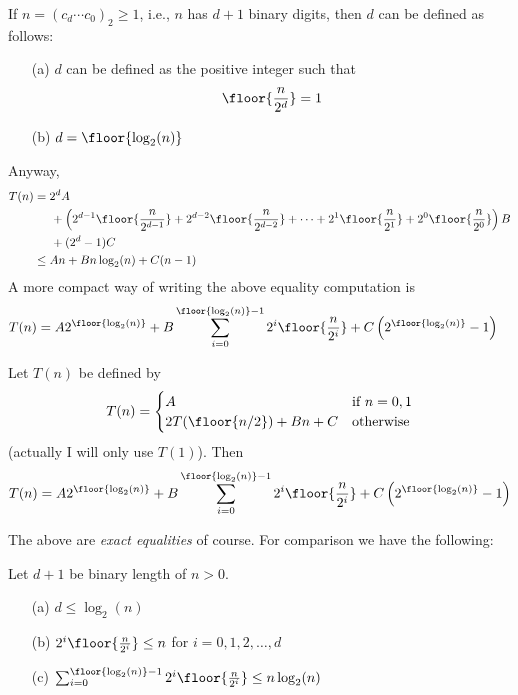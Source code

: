 \begin{thm}
If $n = (c_d \cdots c_0)_2 \geq 1$, i.e., $n$ has $d + 1$ binary digits,
then $d$ can be defined as follows:
\begin{itemize} 
\item[(a)] $d$ can be defined as the positive integer such that
\[
\floor{\frac{n}{2^d}} = 1
\]
\item[(b)] $d = \floor{\log_2(n)}$
\end{itemize}
\end{thm}

Anyway,
\begin{align*}
T(n) 
&= 2^dA \\
&\hspace{0.5cm}
+ \left(
2^{d-1}\floor{ \frac{n}{2^{d-1}} } 
+ 2^{d-2}\floor{ \frac{n}{2^{d-2}} } 
+ \cdots
+ 2^1\floor{ \frac{n}{2^1} } 
+ 2^0\floor{ \frac{n}{2^0} } 
\right)B \\ 
&\hspace{0.5cm}+ (2^d - 1)C  
\\
&\leq An + Bn \log_2(n) + C(n - 1) 
\end{align*}
A more compact way of writing the above equality computation is
\begin{align*}
T(n) 
&= A 2^{\floor{\log_2(n)}}
 + B \sum_{i=0}^{\floor{\log_2(n)} - 1} 2^i\floor{ \frac{n}{2^i} } 
 + C \left(2^{\floor{\log_2(n)}} - 1\right)
\end{align*}

\begin{thm}
Let $T(n)$ be defined by
\[
T(n) =
\begin{cases}
A                        &\text{if $n = 0, 1$} \\
2T(\floor{n/2}) + Bn + C &\text{otherwise}
\end{cases}
\]
(actually I will only use $T(1)$).
Then
\[
T(n) 
= A 2^{\floor{\log_2(n)}}
 + B \sum_{i=0}^{\floor{\log_2(n)} - 1} 2^i\floor{ \frac{n}{2^i} } 
 + C \left(2^{\floor{\log_2(n)}} - 1\right)
\]
\end{thm}

The above are \textit{exact equalities} of course.
For comparison we have the following:

\begin{thm} Let $d + 1$ be binary length of $n > 0$.
\begin{itemize}
\item[(a)] $d \leq \log_2(n)$
\item[(b)] $2^i\floor{ \frac{n}{2^i} } \leq n$ for $i = 0, 1, 2, \ldots, d$
\item[(c)] $\sum_{i=0}^{\floor{\log_2(n)} - 1} 2^i\floor{ \frac{n}{2^i} } \leq n \log_2(n)$
\end{itemize}
\end{thm}

